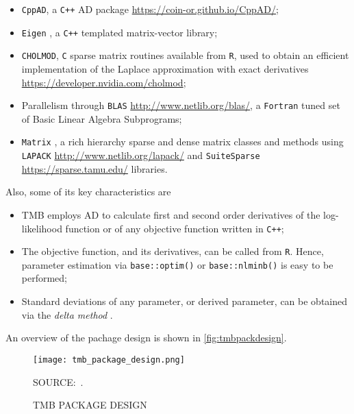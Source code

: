 \begin{itemize}
 \item \texttt{CppAD}, a \texttt{C++} AD
       package \url{https://coin-or.github.io/CppAD/};

 \item \texttt{Eigen} \cite{eigen}, a \texttt{C++} templated
       matrix-vector library;

 \item \texttt{CHOLMOD}, \texttt{C} sparse matrix routines available
       from \texttt{R}, used to obtain an efficient implementation of
       the Laplace approximation with exact
       derivatives \url{https://developer.nvidia.com/cholmod};

 \item Parallelism
       through \texttt{BLAS} \url{http://www.netlib.org/blas/},
       a \texttt{Fortran} tuned set of Basic Linear Algebra Subprograms;

 \item \texttt{Matrix} \cite{Matrix}, a rich hierarchy sparse and dense
       matrix classes and methods
       using \texttt{LAPACK} \url{http://www.netlib.org/lapack/}
       and \texttt{SuiteSparse} \url{https://sparse.tamu.edu/}
       libraries.
\end{itemize}
Also, some of its key characteristics are
\begin{itemize}
 \item TMB employs AD to calculate first and second order derivatives of
       the log-likelihood function or of any objective function written
       in \texttt{C++};

 \item The objective function, and its derivatives, can be called
       from \texttt{R}. Hence, parameter estimation
       via \texttt{base::optim()} or \texttt{base::nlminb()} is easy to
       be performed;

 \item Standard deviations of any parameter, or derived parameter, can
       be obtained via the \textit{delta method} \cite{deltamethod}.
\end{itemize}
An overview of the pachage design is shown in
\autoref{fig:tmbpackdesign}.

\begin{figure}[H]
 \setlength{\abovecaptionskip}{.0001pt}
 \caption{TMB PACKAGE DESIGN}
 \vspace{0.35cm}\centering
 \texttt{[image: tmb\_package\_design.png]}\\
 \vspace{0.1cm}
 \begin{footnotesize}
  SOURCE:~.
 \end{footnotesize}
 \label{fig:tmbpackdesign}
\end{figure}

